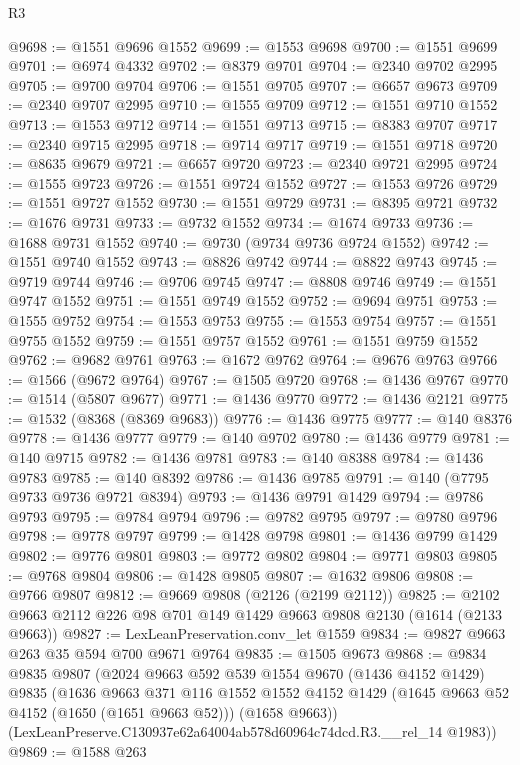 \begin{lexlean}{R3}
\begin{coremodule}
@9698 := @1551 @9696 @1552
@9699 := @1553 @9698
@9700 := @1551 @9699
@9701 := @6974 @4332
@9702 := @8379 @9701
@9704 := @2340 @9702 @2995
@9705 := @9700 @9704
@9706 := @1551 @9705
@9707 := @6657 @9673
@9709 := @2340 @9707 @2995
@9710 := @1555 @9709
@9712 := @1551 @9710 @1552
@9713 := @1553 @9712
@9714 := @1551 @9713
@9715 := @8383 @9707
@9717 := @2340 @9715 @2995
@9718 := @9714 @9717
@9719 := @1551 @9718
@9720 := @8635 @9679
@9721 := @6657 @9720
@9723 := @2340 @9721 @2995
@9724 := @1555 @9723
@9726 := @1551 @9724 @1552
@9727 := @1553 @9726
@9729 := @1551 @9727 @1552
@9730 := @1551 @9729
@9731 := @8395 @9721
@9732 := @1676 @9731
@9733 := @9732 @1552
@9734 := @1674 @9733
@9736 := @1688 @9731 @1552
@9740 := @9730 (@9734 @9736 @9724 @1552)
@9742 := @1551 @9740 @1552
@9743 := @8826 @9742
@9744 := @8822 @9743
@9745 := @9719 @9744
@9746 := @9706 @9745
@9747 := @8808 @9746
@9749 := @1551 @9747 @1552
@9751 := @1551 @9749 @1552
@9752 := @9694 @9751
@9753 := @1555 @9752
@9754 := @1553 @9753
@9755 := @1553 @9754
@9757 := @1551 @9755 @1552
@9759 := @1551 @9757 @1552
@9761 := @1551 @9759 @1552
@9762 := @9682 @9761
@9763 := @1672 @9762
@9764 := @9676 @9763
@9766 := @1566 (@9672 @9764)
@9767 := @1505 @9720
@9768 := @1436 @9767
@9770 := @1514 (@5807 @9677)
@9771 := @1436 @9770
@9772 := @1436 @2121
@9775 := @1532 (@8368 (@8369 @9683))
@9776 := @1436 @9775
@9777 := @140 @8376
@9778 := @1436 @9777
@9779 := @140 @9702
@9780 := @1436 @9779
@9781 := @140 @9715
@9782 := @1436 @9781
@9783 := @140 @8388
@9784 := @1436 @9783
@9785 := @140 @8392
@9786 := @1436 @9785
@9791 := @140 (@7795 @9733 @9736 @9721 @8394)
@9793 := @1436 @9791 @1429
@9794 := @9786 @9793
@9795 := @9784 @9794
@9796 := @9782 @9795
@9797 := @9780 @9796
@9798 := @9778 @9797
@9799 := @1428 @9798
@9801 := @1436 @9799 @1429
@9802 := @9776 @9801
@9803 := @9772 @9802
@9804 := @9771 @9803
@9805 := @9768 @9804
@9806 := @1428 @9805
@9807 := @1632 @9806
@9808 := @9766 @9807
@9812 := @9669 @9808 (@2126 (@2199 @2112))
@9825 := @2102 @9663 @2112 @226 @98 @701 @149 @1429 @9663 @9808 @2130 (@1614 (@2133 @9663))
@9827 := LexLeanPreservation.conv_let @1559
@9834 := @9827 @9663 @263 @35 @594 @700 @9671 @9764
@9835 := @1505 @9673
@9868 := @9834
    @9835
    @9807
    (@2024
      @9663
      @592
      @539
      @1554
      @9670
      (@1436 @4152 @1429)
      @9835
      (@1636
        @9663
        @371
        @116
        @1552
        @1552
        @4152
        @1429
        (@1645 @9663 @52 @4152 (@1650 (@1651 @9663 @52)))
        (@1658 @9663))
      (LexLeanPreserve.C130937e62a64004ab578d60964c74dcd.R3.__rel_14 @1983))
@9869 := @1588 @263

\end{coremodule}
\end{lexlean}
